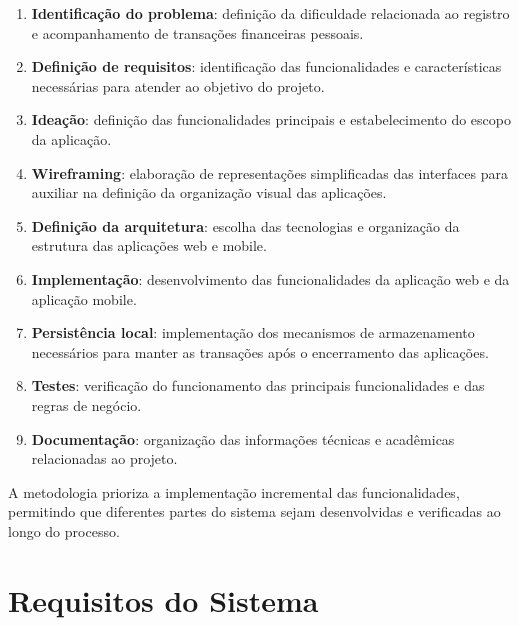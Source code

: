 \documentclass[12pt,a4paper]{article}
\begin{document}
\begin{enumerate}
    \item \textbf{Identificação do problema}: definição da dificuldade relacionada ao registro e acompanhamento de transações financeiras pessoais.
    
    \item \textbf{Definição de requisitos}: identificação das funcionalidades e características necessárias para atender ao objetivo do projeto.
    
    \item \textbf{Ideação}: definição das funcionalidades principais e estabelecimento do escopo da aplicação.
    
    \item \textbf{Wireframing}: elaboração de representações simplificadas das interfaces para auxiliar na definição da organização visual das aplicações.
    
    \item \textbf{Definição da arquitetura}: escolha das tecnologias e organização da estrutura das aplicações web e mobile.
    
    \item \textbf{Implementação}: desenvolvimento das funcionalidades da aplicação web e da aplicação mobile.
    
    \item \textbf{Persistência local}: implementação dos mecanismos de armazenamento necessários para manter as transações após o encerramento das aplicações.
    
    \item \textbf{Testes}: verificação do funcionamento das principais funcionalidades e das regras de negócio.
    
    \item \textbf{Documentação}: organização das informações técnicas e acadêmicas relacionadas ao projeto.
\end{enumerate}

A metodologia prioriza a implementação incremental das funcionalidades, permitindo que diferentes partes do sistema sejam desenvolvidas e verificadas ao longo do processo.

\section{Requisitos do Sistema}
\end{document}
